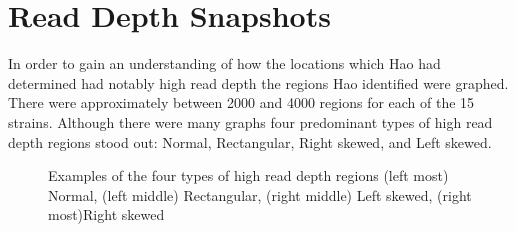 \documentclass[12pt]{article}
\begin{document}
\section{Read Depth Snapshots}
	In order to gain an understanding of how the locations which Hao had determined had notably high read depth the regions Hao identified were graphed. There were approximately between 2000 and 4000 regions for each of the 15 strains. Although there were many graphs four predominant types of high read depth regions stood out: Normal, Rectangular, Right skewed, and Left skewed.
\begin{figure}[H]
	\begin{centering}
		\begin{singlespace}
			\vspace{-0.5cm}
			\caption[Examples of the four types of high read depth regions.]{Examples of the four types of high read depth regions (left most) Normal, (left middle) Rectangular, (right middle) Left skewed, (right most)Right skewed}\label{four_rds}
		\end{singlespace}
	\end{centering}
\end{figure}

%
%
\end{document}
